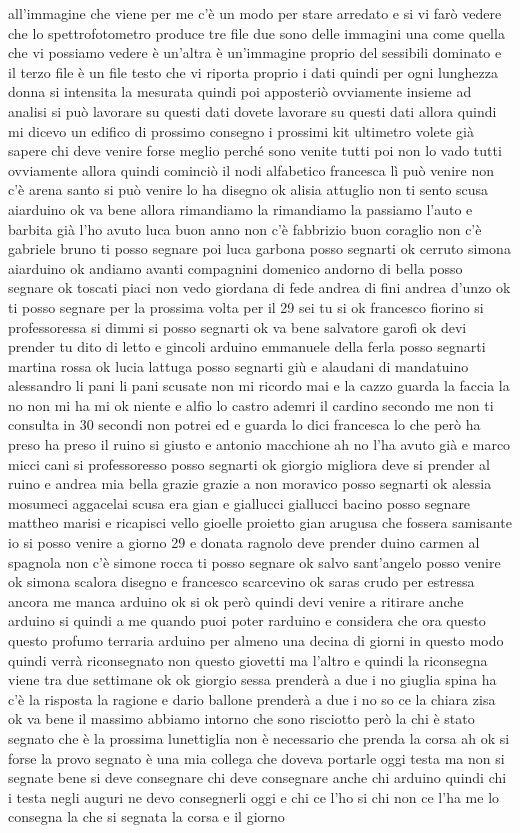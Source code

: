 all'immagine che viene per me c'è un modo per stare arredato e si vi farò vedere che lo spettrofotometro produce tre file due sono delle immagini una come quella che vi possiamo vedere è un'altra è un'immagine proprio del sessibili dominato e il terzo file è un file testo che vi riporta proprio i dati quindi per ogni lunghezza donna si intensita la mesurata quindi poi apposteriò ovviamente insieme ad analisi si può lavorare su questi dati dovete lavorare su questi dati allora quindi mi dicevo un edifico di prossimo consegno i prossimi kit ultimetro volete già sapere chi deve venire forse meglio perché sono venite tutti poi non lo vado tutti ovviamente allora quindi cominciò il nodi alfabetico francesca lì può venire non c'è arena santo si può venire lo ha disegno ok alisia attuglio non ti sento scusa aiarduino ok va bene allora rimandiamo la rimandiamo la passiamo l'auto e barbita già l'ho avuto luca buon anno non c'è fabbrizio buon coraglio non c'è gabriele bruno ti posso segnare poi luca garbona posso segnarti ok cerruto simona aiarduino ok andiamo avanti compagnini domenico andorno di bella posso segnare ok toscati piaci non vedo giordana di fede andrea di fini andrea d'unzo ok ti posso segnare per la prossima volta per il 29 sei tu si ok francesco fiorino si professoressa si dimmi si posso segnarti ok va bene salvatore garofi ok devi prender tu dito di letto e gincoli arduino emmanuele della ferla posso segnarti martina rossa ok lucia lattuga posso segnarti giù e alaudani di mandatuino alessandro li pani li pani scusate non mi ricordo mai e la cazzo guarda la faccia la no non mi ha mi ok niente e alfio lo castro ademri il cardino secondo me non ti consulta in 30 secondi non potrei ed e guarda lo dici francesca lo che però ha preso ha preso il ruino si giusto e antonio macchione ah no l'ha avuto già e marco micci cani si professoresso posso segnarti ok giorgio migliora deve si prender al ruino e andrea mia bella grazie grazie a non moravico posso segnarti ok alessia mosumeci aggacelai scusa era gian e giallucci giallucci bacino posso segnare mattheo marisi e ricapisci vello gioelle proietto gian arugusa che fossera samisante io si posso venire a giorno 29 e donata ragnolo deve prender duino carmen al spagnola non c'è simone rocca ti posso segnare ok salvo sant'angelo posso venire ok simona scalora disegno e francesco scarcevino ok saras crudo per estressa ancora me manca arduino ok si ok però quindi devi venire a ritirare anche arduino si quindi a me quando puoi poter rarduino e considera che ora questo questo profumo terraria arduino per almeno una decina di giorni in questo modo quindi verrà riconsegnato non questo giovetti ma l'altro e quindi la riconsegna viene tra due settimane ok ok giorgio sessa prenderà a due i no giuglia spina ha c'è la risposta la ragione e dario ballone prenderà a due i no so ce la chiara zisa ok va bene il massimo abbiamo intorno che sono risciotto però la chi è stato segnato che è la prossima lunettiglia non è necessario che prenda la corsa ah ok si forse la provo segnato è una mia collega che doveva portarle oggi testa ma non si segnate bene si deve consegnare chi deve consegnare anche chi arduino quindi chi i testa negli auguri ne devo consegnerli oggi e chi ce l'ho si chi non ce l'ha me lo consegna la che si segnata la corsa e il giorno 
